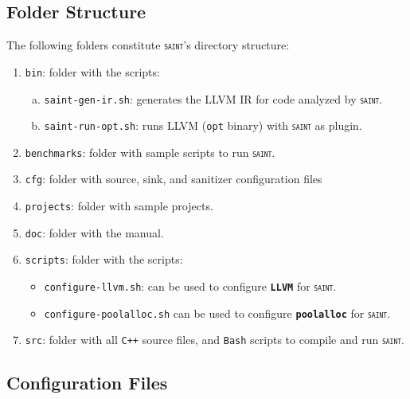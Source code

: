 \documentclass[12pt,onecolumn,a4paper]{article}
\newcommand{\saint}{\texttt{\textsc{saint}}\xspace}
\newcommand{\softwarenov}[1]{\texttt{\textbf{#1}}\xspace}
\newcommand{\tool}[1]{\texttt{#1}\xspace}
\begin{document}
\subsection{Folder Structure}
The following folders constitute \saint's directory structure:
\begin{enumerate}[1)]
	\item \texttt{bin}: folder with the scripts:
	\begin{enumerate}[a)]
		\item \texttt{saint-gen-ir.sh}: generates the LLVM IR for code analyzed by \saint.
		\item \texttt{saint-run-opt.sh}: runs LLVM (\texttt{opt} binary) with \saint as plugin.
	\end{enumerate}
	
	\item \texttt{benchmarks}: folder with sample
	scripts to run \saint.

	\item \texttt{cfg}: folder with source, sink, and sanitizer configuration files
		
	\item \texttt{projects}: folder with sample projects.	

	\item \texttt{doc}: folder with the manual.

	\item \texttt{scripts}: folder with the scripts:
	\begin{itemize}[a)]
		\item \texttt{configure-llvm.sh}: can be used to configure \softwarenov{LLVM} for \saint.	
		\item \texttt{configure-poolalloc.sh} can be used to configure \softwarenov{poolalloc} for \saint.	
	\end{itemize}
	
	\item \texttt{src}: folder with all \texttt{C++} source files,
	and \tool{Bash} scripts to compile and run \saint.			
\end{enumerate}

\subsection{Configuration Files}
\end{document}
